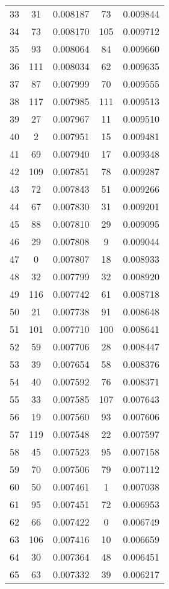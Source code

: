\documentclass{article}
\begin{document}
\begin{center}
\begin{longtable}{|c|c|c|c|r|}
33 & 31  &0.008187 & 73  & 0.009844 \\
34 & 73  &0.008170 & 105  & 0.009712 \\ 
35 & 93  &0.008064 & 84  & 0.009660 \\ 
36 & 111  &0.008034 & 62  & 0.009635 \\ 
37 & 87  &0.007999 & 70  & 0.009555 \\ 
38 & 117  &0.007985 & 111  & 0.009513 \\ 
39 & 27  &0.007967 & 11  & 0.009510 \\ 
40 & 2  &0.007951 & 15  & 0.009481 \\ 
41 & 69  &0.007940 & 17  & 0.009348 \\ 
42 & 109  &0.007851 & 78  & 0.009287 \\ 
43 & 72  &0.007843 & 51  & 0.009266 \\
44 & 67  &0.007830 & 31  & 0.009201 \\ 
45 & 88  &0.007810 & 29  & 0.009095 \\ 
46 & 29  &0.007808 & 9  & 0.009044 \\ 
47 & 0  &0.007807 & 18  & 0.008933 \\ 
48 & 32  &0.007799 & 32  & 0.008920 \\ 
49 & 116  &0.007742 & 61  & 0.008718 \\
50 & 21  &0.007738 & 91  & 0.008648 \\
51 & 101  &0.007710 & 100  & 0.008641 \\ 
52 & 59  &0.007706 & 28  & 0.008447 \\
53 & 39  &0.007654 & 58  & 0.008376 \\
54 & 40  &0.007592 & 76  & 0.008371 \\ 
55 & 33  &0.007585 & 107  & 0.007643 \\ 
56 & 19  &0.007560 & 93  & 0.007606 \\
57 & 119  &0.007548 & 22  & 0.007597 \\ 
58 & 45  &0.007523 & 95  & 0.007158 \\ 
59 & 70  &0.007506 & 79  & 0.007112 \\ 
60 & 50  &0.007461 & 1  & 0.007038 \\ 
61 & 95  &0.007451 & 72  & 0.006953 \\ 
62 & 66  &0.007422 & 0  & 0.006749 \\ 
63 & 106  &0.007416 & 10  & 0.006659 \\
64 & 30  &0.007364 & 48  & 0.006451 \\ 
65 & 63  &0.007332 & 39  & 0.006217 \\

\end{longtable}
\end{center}
\end{document}
